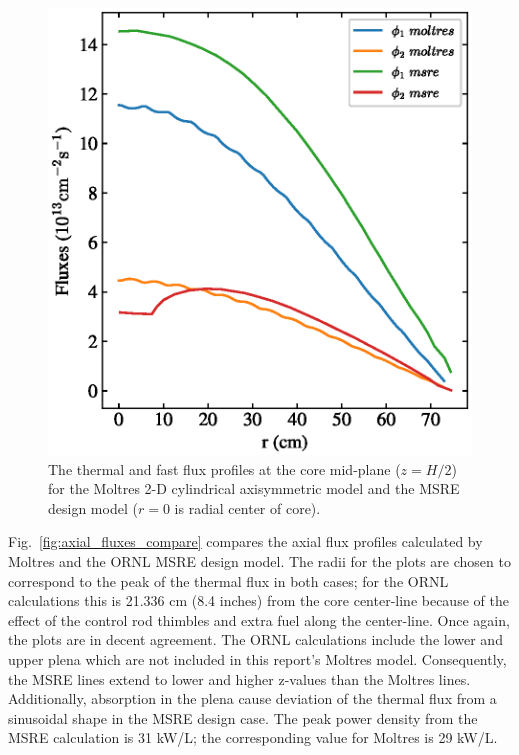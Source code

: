 \documentclass{anstrans}
\begin{document}
\begin{figure}[htpb]
    \centering
      \includegraphics[width=\linewidth]{combined_msre_moltres_radial.eps}
      \caption{The thermal and fast flux profiles at the core mid-plane
        ($z=H/2$) for the Moltres 2-D cylindrical axisymmetric model and the
        \gls{MSRE} design model \cite[p. 92]{briggs_molten-salt_1964} ($r=0$ is
        radial center of core).}
    \label{fig:radial_fluxes_compare}
\end{figure}

Fig.~\ref{fig:axial_fluxes_compare} compares the axial flux profiles calculated by
Moltres and the \gls{ORNL} \gls{MSRE} design model. The radii for the plots are
chosen to correspond to the peak of the thermal flux in both cases; for the
\gls{ORNL} calculations this is 21.336 cm (8.4 inches) from the core center-line because of
the effect of the control rod thimbles and extra fuel along the
center-line. Once again, the plots are in decent agreement. The \gls{ORNL}
calculations include the lower and upper plena which are not included in this
report's Moltres model. Consequently, the \gls{MSRE} lines extend to lower and
higher z-values than the Moltres lines. Additionally, absorption
in the plena cause deviation of the thermal flux from a sinusoidal shape in the
\gls{MSRE} design case. The peak power density from the \gls{MSRE} calculation
is 31 kW/L; the corresponding value for Moltres is 29 kW/L.
\end{document}
